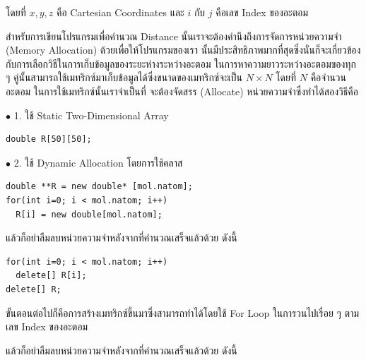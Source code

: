 \noindent โดยที่ $x, y, z$ คือ Cartesian Coordinates และ $i$ กับ $j$ คือเลข Index ของอะตอม

สำหรับการเขียนโปรแกรมเพื่อคำนวณ Distance นั้นเราจะต้องคำนึงถึงการจัดการหน่วยความจำ (Memory Allocation) ด้วยเพื่อให้โปรแกรมของเรา%
นั้นมีประสิทธิภาพมากที่สุดซึ่งนั่นก็จะเกี่ยวข้องกับการเลือกวิธีในการเก็บข้อมูลของระยะห่างระหว่างอะตอม ในการหาความยาวระหว่างอะตอมของทุก ๆ
คู่นั้นสามารถใช้เมทริกซ์มาเก็บข้อมูลได้ซึ่งขนาดของเมทริกซ์จะเป็น $N \times N$ โดยที่ $N$ คือจำนวนอะตอม ในการใช้เมทริกซ์นั้นเราจำเป็นที่%
จะต้องจัดสรร (Allocate) หน่วยความจำซึ่งทำได้สองวิธีคือ

\noindent $\bullet$ 1. ใช้ Static Two-Dimensional Array

\vspace{5pt}

\begin{lstlisting}[style=MyC++]
double R[50][50];
\end{lstlisting}

\vspace{5pt}

\noindent $\bullet$ 2. ใช้ Dynamic Allocation โดยการใช้คลาส 

\vspace{5pt}

\begin{lstlisting}[style=MyC++]
double **R = new double* [mol.natom];
for(int i=0; i < mol.natom; i++)
  R[i] = new double[mol.natom];
\end{lstlisting}

\vspace{5pt}

\noindent แล้วก็อย่าลืมลบหน่วยความจำหลังจากที่คำนวณเสร็จแล้วด้วย ดังนี้

\vspace{5pt}

\begin{lstlisting}[style=MyC++]
for(int i=0; i < mol.natom; i++)
  delete[] R[i];
delete[] R;
\end{lstlisting}

\vspace{5pt}

ขั้นตอนต่อไปก็คือการสร้างเมทริกซ์ขึ้นมาซึ่งสามารถทำได้โดยใช้ For Loop ในการวนไปเรื่อย ๆ ตามเลข Index ของอะตอม

\vspace{5pt}

\noindent แล้วก็อย่าลืมลบหน่วยความจำหลังจากที่คำนวณเสร็จแล้วด้วย ดังนี้

\vspace{5pt}

